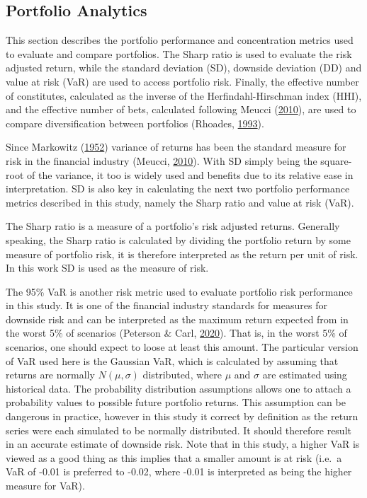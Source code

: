 \documentclass[11pt,preprint, authoryear]{elsarticle}
\numberwithin{equation}{section}
\numberwithin{figure}{section}
\numberwithin{table}{section}
\begin{document}
\hypertarget{portfolio-analytics}{%
\subsection{\texorpdfstring{Portfolio Analytics
\label{portmet}}{Portfolio Analytics }}\label{portfolio-analytics}}

This section describes the portfolio performance and concentration
metrics used to evaluate and compare portfolios. The Sharp ratio is used
to evaluate the risk adjusted return, while the standard deviation (SD),
downside deviation (DD) and value at risk (VaR) are used to access
portfolio risk. Finally, the effective number of constitutes, calculated
as the inverse of the Herfindahl-Hirschman index (HHI), and the
effective number of bets, calculated following Meucci
(\protect\hyperlink{ref-meucci2010}{2010}), are used to compare
diversification between portfolios (Rhoades,
\protect\hyperlink{ref-rhoades1993}{1993}).

Since Markowitz (\protect\hyperlink{ref-markowitz}{1952}) variance of
returns has been the standard measure for risk in the financial industry
(Meucci, \protect\hyperlink{ref-meucci2010}{2010}). With SD simply being
the square-root of the variance, it too is widely used and benefits due
to its relative ease in interpretation. SD is also key in calculating
the next two portfolio performance metrics described in this study,
namely the Sharp ratio and value at risk (VaR).

The Sharp ratio is a measure of a portfolio's risk adjusted returns.
Generally speaking, the Sharp ratio is calculated by dividing the
portfolio return by some measure of portfolio risk, it is therefore
interpreted as the return per unit of risk. In this work SD is used as
the measure of risk.

The 95\% VaR is another risk metric used to evaluate portfolio risk
performance in this study. It is one of the financial industry standards
for measures for downside risk and can be interpreted as the maximum
return expected from in the worst 5\% of scenarios (Peterson \& Carl,
\protect\hyperlink{ref-PerformanceAnalytics}{2020}). That is, in the
worst 5\% of scenarios, one should expect to loose at least this amount.
The particular version of VaR used here is the Gaussian VaR, which is
calculated by assuming that returns are normally \(N(\mu,\sigma)\)
distributed, where \(\mu\) and \(\sigma\) are estimated using historical
data. The probability distribution assumptions allows one to attach a
probability values to possible future portfolio returns. This assumption
can be dangerous in practice, however in this study it correct by
definition as the return series were each simulated to be normally
distributed. It should therefore result in an accurate estimate of
downside risk. Note that in this study, a higher VaR is viewed as a good
thing as this implies that a smaller amount is at risk (i.e.~a VaR of
-0.01 is preferred to -0.02, where -0.01 is interpreted as being the
higher measure for VaR).
\end{document}
